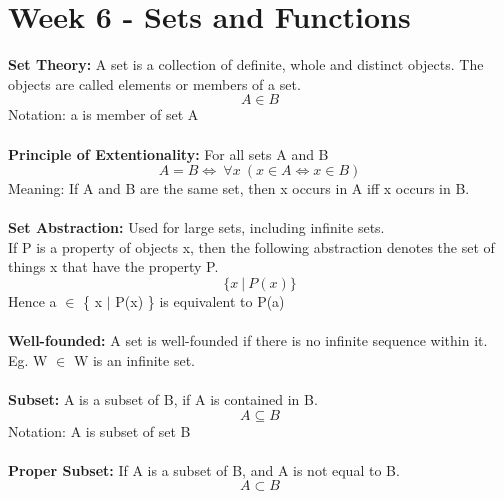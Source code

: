 \documentclass[a4paper,10pt]{article}
\begin{document}
\section*{Week 6 - Sets and Functions }
\textcolor{BlueGreen}{\textbf{Set Theory:}} A set is a collection of definite, whole and distinct objects. The objects are called elements or members of a set.  \\ 
\begin{equation*}
A \in B 
\end{equation*}
\textcolor{BlueGreen}{Notation:} a is member of set A \\\\
\textcolor{BlueGreen}{\textbf{Principle of Extentionality:}} For all sets A and B \\
\begin{equation*}
A = B \Leftrightarrow \ \forall x \ (x \in A \Leftrightarrow x \in B)
\end{equation*}
\textcolor{BlueGreen}{Meaning:} If A and B are the same set, then x occurs in A iff x occurs in B. \\\\
\textcolor{BlueGreen}{\textbf{Set Abstraction:}} Used for large sets, including infinite sets. \\
If P is a property of objects x, then the following \textcolor{BlueGreen}{abstraction} denotes the set of things x that have the property P.
\begin{equation*}
\{  x \  | \  P(x) \}
\end{equation*}
Hence a $\in$ \{ x $|$ P(x) \} is equivalent to P(a) \\\\
\textcolor{BlueGreen}{\textbf{Well-founded:}} A set is well-founded if there is no infinite sequence within it. Eg. W $\in$ W is an infinite set. \\\\
\textcolor{BlueGreen}{\textbf{Subset:}} A is a subset of B, if A is contained in B. \\ 
\begin{equation*}
A \subseteq B 
\end{equation*}
\textcolor{BlueGreen}{Notation:} A is subset of set B \\\\
\textcolor{BlueGreen}{\textbf{Proper Subset:}} If A is a subset of B, and A is not equal to B. \\
\begin{equation*}
A \subset B
\end{equation*}
\end{document}

